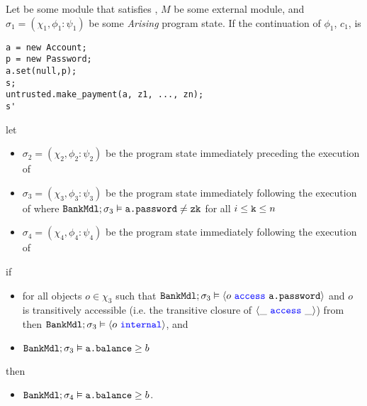 \begin{theorem}
\label{thm:safety}
Let  be some module that satisfies \SrobustB, 
$M$ be some external module, and $\sigma_1 = (\chi_1, \phi_1 : \psi_1)$ be some \textit{Arising} program state. If the continuation of $\phi_1$, $c_1$, is
\begin{verbatim}
a = new Account; 
p = new Password; 
a.set(null,p); 
s; 
untrusted.make_payment(a, z1, ..., zn); 
s'
\end{verbatim}
let 
\begin{itemize}
\item
$\sigma_2 = (\chi_2, \phi_2 : \psi_2)$ be the program state immediately preceding the execution of 
\item
$\sigma_3 = (\chi_3, \phi_3 : \psi_3)$ be the program state immediately following the execution of  where ${\texttt{BankMdl}};\sigma_3 \vDash {\texttt{a.password}} \neq {\texttt{zk}}$ for all $i \leq {\texttt{k}} \leq n$
\item
$\sigma_4 = (\chi_4, \phi_4 : \psi_4)$ be the program state immediately following the execution of\\  
\end{itemize}
if 
\begin{itemize}
\item
for all objects $o \in \chi_3$ such that ${\texttt{BankMdl}}; \sigma_3 \vDash \langle o\ {\color{blue}\texttt{access}}\ {\texttt{a.password}} \rangle$ and $o$ is transitively accessible (i.e. the transitive closure of $\langle \_\ {\color{blue}\texttt{access}}\ \_ \rangle$) from 
then ${\texttt{BankMdl}}; \sigma_3 \vDash \langle o\ {\color{blue}\texttt{internal}}\rangle$, and
\item
${\texttt{BankMdl}}; \sigma_3 \vDash {\texttt{a.balance}}\geq b$
\end{itemize}
then 
\begin{itemize}
\item
${\texttt{BankMdl}};\sigma_4 \vDash {\texttt{a.balance}} \geq b$.
\end{itemize}
\end{theorem}
